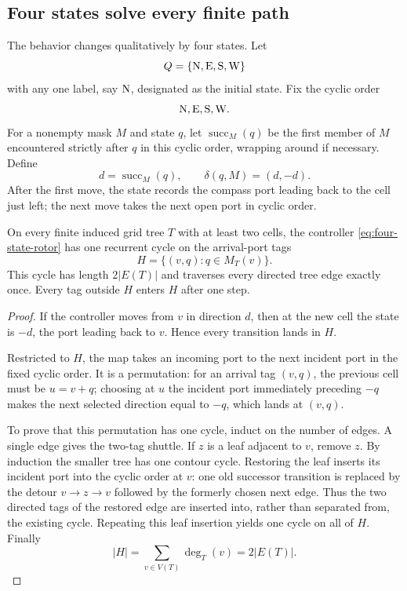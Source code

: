 \subsection{Four states solve every finite path}

The behavior changes qualitatively by four states.  Let
\[
 Q=\{\mathrm{N},\mathrm{E},\mathrm{S},\mathrm{W}\}
\]
with any one label, say $\mathrm{N}$, designated as the initial state.  Fix the cyclic order
\[
 \mathrm{N},\mathrm{E},\mathrm{S},\mathrm{W}.
\]
For a nonempty mask $M$ and state $q$, let $\operatorname{succ}_M(q)$ be the first member of $M$ encountered strictly after $q$ in this cyclic order, wrapping around if necessary.  Define
\begin{equation}\label{eq:four-state-rotor}
 d=\operatorname{succ}_M(q),
 \qquad
 \delta(q,M)=(d,-d).
\end{equation}
After the first move, the state records the compass port leading back to the cell just left; the next move takes the next open port in cyclic order.

\begin{proposition}\label{prop:four-state-contour}
On every finite induced grid tree $T$ with at least two cells, the controller \eqref{eq:four-state-rotor} has one recurrent cycle on the arrival-port tags
\[
 H=\{(v,q):q\in M_T(v)\}.
\]
This cycle has length $2|E(T)|$ and traverses every directed tree edge exactly once.  Every tag outside $H$ enters $H$ after one step.
\end{proposition}
\begin{proof}
If the controller moves from $v$ in direction $d$, then at the new cell the state is $-d$, the port leading back to $v$.  Hence every transition lands in $H$.

Restricted to $H$, the map takes an incoming port to the next incident port in the fixed cyclic order.  It is a permutation: for an arrival tag $(v,q)$, the previous cell must be $u=v+q$; choosing at $u$ the incident port immediately preceding $-q$ makes the next selected direction equal to $-q$, which lands at $(v,q)$.

To prove that this permutation has one cycle, induct on the number of edges.  A single edge gives the two-tag shuttle.  If $z$ is a leaf adjacent to $v$, remove $z$.  By induction the smaller tree has one contour cycle.  Restoring the leaf inserts its incident port into the cyclic order at $v$: one old successor transition is replaced by the detour $v\to z\to v$ followed by the formerly chosen next edge.  Thus the two directed tags of the restored edge are inserted into, rather than separated from, the existing cycle.  Repeating this leaf insertion yields one cycle on all of $H$.  Finally
\[
 |H|=\sum_{v\in V(T)}\deg_T(v)=2|E(T)|.
\]
\end{proof}

